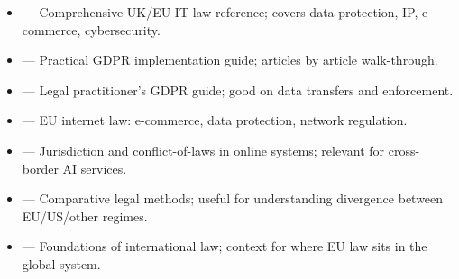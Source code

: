\begin{tcbitemize}[ skin=sectionraster ]
    \tcbitem[title={Further Reading}, raster multicolumn=6]
    \begin{itemize}
        \item {} --- Comprehensive UK/EU IT law reference; covers data protection, IP, e-commerce, cybersecurity.
        \item {} --- Practical GDPR implementation guide; articles by article walk-through.
        \item {} --- Legal practitioner's GDPR guide; good on data transfers and enforcement.
        \item {} --- EU internet law: e-commerce, data protection, network regulation.
        \item {} --- Jurisdiction and conflict-of-laws in online systems; relevant for cross-border AI services.
        \item {} --- Comparative legal methods; useful for understanding divergence between EU/US/other regimes.
        \item {} --- Foundations of international law; context for where EU law sits in the global system.
    \end{itemize}
\end{tcbitemize}
